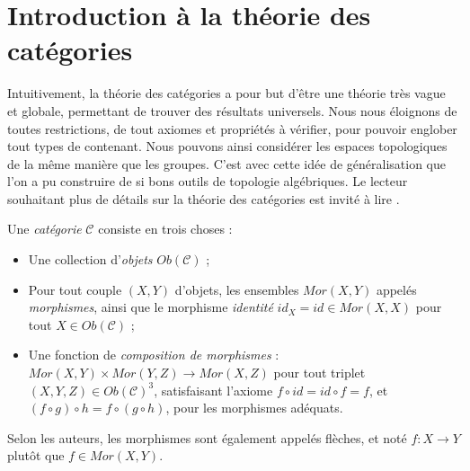 \chapter{Introduction à la théorie des catégories}\label{chap:categories}

Intuitivement, la théorie des catégories a pour but d'être une théorie très vague et globale, permettant de trouver des résultats universels. Nous nous éloignons de toutes restrictions, de tout axiomes et propriétés à vérifier, pour pouvoir englober tout types de contenant. Nous pouvons ainsi considérer les espaces topologiques de la même manière que les groupes. C'est avec cette idée de généralisation que l'on a pu construire de si bons outils de topologie algébriques. Le lecteur souhaitant plus de détails sur la théorie des catégories est invité à lire \cite{MacLane}.

\begin{definition}
Une \emph{catégorie} $\mathcal{C}$ consiste en trois choses : \begin{itemize}[label=$\bullet$]
    \item Une collection d'\emph{objets} $Ob(\mathcal{C})$ ;
    \item Pour tout couple $(X,Y)$ d'objets, les ensembles $Mor(X,Y)$ appelés \emph{morphismes}, ainsi que le morphisme \emph{identité} $id_X=id\in Mor(X,X)$ pour tout $X\in Ob(\mathcal{C})$ ;
    \item Une fonction de \emph{composition de morphismes} : $Mor(X,Y)\times Mor(Y,Z)\to Mor(X,Z)$ pour tout triplet $(X,Y,Z)\in Ob(\mathcal{C})^3$, satisfaisant l'axiome $f\circ id=id\circ f=f$, et $(f\circ g)\circ h=f\circ(g\circ h)$, pour les morphismes adéquats.
\end{itemize}
\end{definition}

Selon les auteurs, les morphismes sont également appelés flèches, et noté $f:X\to Y$ plutôt que $f\in Mor(X,Y)$.

